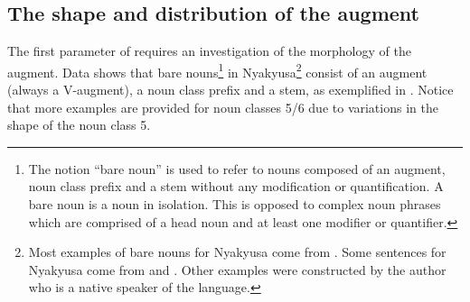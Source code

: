 \documentclass[output=paper]{langscibook}
\begin{document}
\subsection{The shape and distribution of the augment}\label{sec:lusekelo:2.1}  %

The first parameter of \citet{GuéroisEtAl2017} requires an investigation of the morphology of the augment. Data shows that bare nouns\footnote{The notion “bare noun” is used to refer to nouns composed of an augment, noun class prefix and a stem without any modification or quantification. A bare noun is a noun in isolation. This is opposed to complex noun phrases which are comprised of a head noun and at least one modifier or quantifier.}  in Nyakyusa\footnote{Most examples of bare nouns for Nyakyusa come from \citet{Felberg1996}. Some sentences for Nyakyusa come from \citet{Lusekelo2012} and \citet{Persohn2017}. Other examples were constructed by the author who is a native speaker of the language.}  consist of an augment (always a V-aug\-ment), a noun class prefix and a stem, as exemplified in . Notice that more examples are provided for noun classes 5/6 due to variations in the shape of the noun class 5.  
\end{document}
